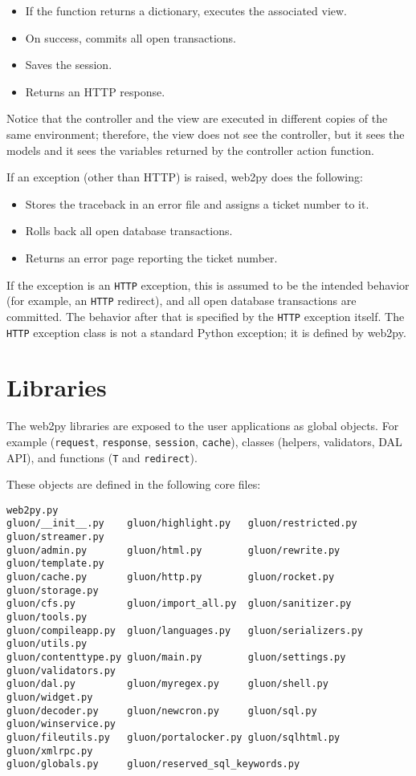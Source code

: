 \documentclass[justified,sixbynine,notoc]{tufte-book}
\def\ft{\small\tt}
\begin{document}
\begin{fullwidth}
\begin{itemize}
\item If the function returns a dictionary, executes the associated view.

\item On success, commits all open transactions.

\item Saves the session.

\item Returns an HTTP response.
\end{itemize}

Notice that the controller and the view are executed in different copies of the same environment; therefore, the view does not see the controller, but it sees the models and it sees the variables returned by the controller action function.

If an exception (other than HTTP) is raised, web2py does the following:
\begin{itemize}
\item Stores the traceback in an error file and assigns a ticket number to it.

\item Rolls back all open database transactions.

\item Returns an error page reporting the ticket number.
\end{itemize}

If the exception is an {\ft HTTP} exception, this is assumed to be the intended behavior (for example, an {\ft HTTP} redirect), and all open database transactions are committed. The behavior after that is specified by the {\ft HTTP} exception itself. The {\ft HTTP} exception class is not a standard Python exception; it is defined by web2py.

\goodbreak\section{Libraries}

The web2py libraries are exposed to the user applications as global objects. For example ({\ft request}, {\ft response}, {\ft session}, {\ft cache}), classes (helpers,  validators, DAL API), and functions ({\ft T} and {\ft redirect}).

These objects are defined in the following core files:
\begin{lstlisting}
web2py.py
gluon/__init__.py    gluon/highlight.py   gluon/restricted.py  gluon/streamer.py
gluon/admin.py       gluon/html.py        gluon/rewrite.py     gluon/template.py
gluon/cache.py       gluon/http.py        gluon/rocket.py      gluon/storage.py
gluon/cfs.py         gluon/import_all.py  gluon/sanitizer.py   gluon/tools.py
gluon/compileapp.py  gluon/languages.py   gluon/serializers.py gluon/utils.py
gluon/contenttype.py gluon/main.py        gluon/settings.py    gluon/validators.py
gluon/dal.py         gluon/myregex.py     gluon/shell.py       gluon/widget.py
gluon/decoder.py     gluon/newcron.py     gluon/sql.py         gluon/winservice.py
gluon/fileutils.py   gluon/portalocker.py gluon/sqlhtml.py     gluon/xmlrpc.py
gluon/globals.py     gluon/reserved_sql_keywords.py
\end{lstlisting}


\end{fullwidth}
\end{document}
